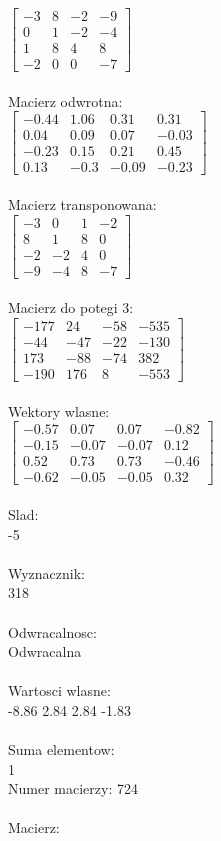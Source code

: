 \documentclass[a4paper,12pt]{article}
\begin{document}
$\begin{bmatrix} -3&8&-2&-9\\0&1&-2&-4\\1&8&4&8\\-2&0&0&-7 \end{bmatrix}$
\\
\\
Macierz odwrotna:\\

$\begin{bmatrix} -0.44&1.06&0.31&0.31\\0.04&0.09&0.07&-0.03\\-0.23&0.15&0.21&0.45\\0.13&-0.3&-0.09&-0.23 \end{bmatrix}$
\\
\\
Macierz transponowana:\\

$\begin{bmatrix} -3&0&1&-2\\8&1&8&0\\-2&-2&4&0\\-9&-4&8&-7 \end{bmatrix}$
\\
\\
Macierz do potegi 3:\\

$\begin{bmatrix} -177&24&-58&-535\\-44&-47&-22&-130\\173&-88&-74&382\\-190&176&8&-553 \end{bmatrix}$
\\
\\
Wektory wlasne:\\

$\begin{bmatrix} -0.57&0.07&0.07&-0.82\\-0.15&-0.07&-0.07&0.12\\0.52&0.73&0.73&-0.46\\-0.62&-0.05&-0.05&0.32 \end{bmatrix}$
\\
\\
Slad:\\
-5
\\
\\
Wyznacznik:\\
318
\\
\\
Odwracalnosc:\\
Odwracalna
\\
\\
Wartosci wlasne:\\
-8.86 2.84 2.84 -1.83
\\
\\
Suma elementow:\\
1
\\
\newpage
Numer macierzy:
724
\\
\\
Macierz:\\
\end{document}
